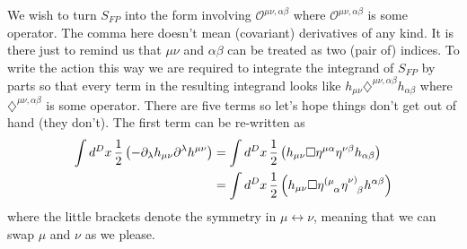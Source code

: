 \documentclass{book}
\theoremstyle{definition}
\newcommand{\p}{\partial}
\newcommand{\nn}{\nonumber}
\newcommand{\f}[2]{\frac{#1}{#2}}
\newcommand{\lp}{\left(}
\newcommand{\rp}{\right)}
\begin{document}
We wish to turn $S_{FP}$ into the form involving $\mathcal{O}^{\mu\nu,\alpha\beta}$ where $\mathcal{O}^{\mu\nu,\alpha\beta}$ is some operator. The comma here doesn't mean (covariant) derivatives of any kind. It is there just to remind us that $\mu\nu$ and $\alpha\beta$ can be treated as two (pair of) indices. To write the action this way we are required to integrate the integrand of $S_{FP}$ by parts so that every term in the resulting integrand looks like $h_{\mu\nu}\diamondsuit^{\mu\nu,\alpha\beta}h_{\alpha\beta}$ where $\diamondsuit^{\mu\nu,\alpha\beta}$ is some operator. There are five terms so let's hope things don't get out of hand (they don't). The first term can be re-written as
\begin{align}
\int d^Dx\, \f{1}{2} \lp -\p_\lambda h_{\mu\nu}\p^\lambda h^{\mu\nu} \rp 
&= \int d^Dx\, \f{1}{2}\lp h_{\mu\nu} \square \eta^{\mu\alpha}\eta^{\nu\beta}h_{\alpha\beta} \rp\nn\\
&= \int d^Dx\, \f{1}{2}\lp h_{\mu\nu} \square \tensor{\eta}{^{(\mu}_\alpha}\tensor{\eta}{^{\nu)}_{\beta}}h^{\alpha\beta} \rp
\end{align}
where the little brackets denote the symmetry in $\mu \leftrightarrow \nu$, meaning that we can swap $\mu$ and $\nu$ as we please. \\
\end{document}
